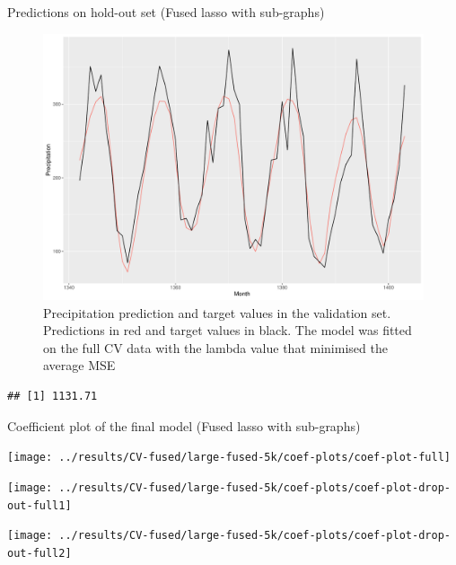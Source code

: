 \documentclass[
  ignorenonframetext,
]{beamer}
\begin{document}
\begin{frame}[fragile]{Predictions on hold-out set (Fused lasso with
sub-graphs)}
\protect\hypertarget{predictions-on-hold-out-set-fused-lasso-with-sub-graphs}{}
\begin{figure}

{\centering \includegraphics[width=0.75\linewidth]{ma-presentation_files/figure-beamer/pred-plot-full-fused-sub-1} 

}

\caption{Precipitation prediction and target values in the validation set. Predictions in red and target values in black. The model was fitted on the full CV data with the lambda value that minimised the average MSE}\label{fig:pred-plot-full-fused-sub}
\end{figure}

\begin{verbatim}
## [1] 1131.71
\end{verbatim}
\end{frame}

\begin{frame}{Coefficient plot of the final model (Fused lasso with
sub-graphs)}
\protect\hypertarget{coefficient-plot-of-the-final-model-fused-lasso-with-sub-graphs}{}
\begin{center}\texttt{[image: ../results/CV-fused/large-fused-5k/coef-plots/coef-plot-full]} \end{center}

\begin{center}\texttt{[image: ../results/CV-fused/large-fused-5k/coef-plots/coef-plot-drop-out-full1]} \end{center}

\begin{center}\texttt{[image: ../results/CV-fused/large-fused-5k/coef-plots/coef-plot-drop-out-full2]} \end{center}
\end{frame}
\end{document}
